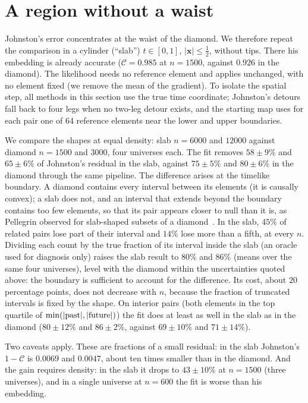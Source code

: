 \documentclass[prd,twocolumn,superscriptaddress,nofootinbib,amsmath,amssymb,floatfix]{revtex4-2}
\begin{document}
\section{A region without a waist}\label{sec:slab}
Johnston's error concentrates at the waist of the diamond. We therefore repeat the comparison in a cylinder (``slab'') $t\in[0,1]$, $|\mathbf x|\le\tfrac12$, without tips. There his embedding is already accurate ($\mathcal C=0.985$ at $n=1500$, against $0.926$ in the diamond). The likelihood needs no reference element and applies unchanged, with no element fixed (we remove the mean of the gradient). To isolate the spatial step, all methods in this section use the true time coordinate; Johnston's detours fall back to four legs when no two-leg detour exists, and the starting map uses for each pair one of 64 reference elements near the lower and upper boundaries.

We compare the shapes at equal density: slab $n=6000$ and $12000$ against diamond $n=1500$ and $3000$, four universes each. The fit removes $58\pm9\%$ and $65\pm6\%$ of Johnston's residual in the slab, against $75\pm5\%$ and $80\pm6\%$ in the diamond through the same pipeline. The difference arises at the timelike boundary. A diamond contains every interval between its elements (it is causally convex); a slab does not, and an interval that extends beyond the boundary contains too few elements, so that its pair appears closer to null than it is, as Pellegrin observed for slab-shaped subsets of a diamond~\cite{Pellegrin26}. In the slab, $45\%$ of related pairs lose part of their interval and $14\%$ lose more than a fifth, at every $n$. Dividing each count by the true fraction of its interval inside the slab (an oracle used for diagnosis only) raises the slab result to $80\%$ and $86\%$ (means over the same four universes), level with the diamond within the uncertainties quoted above: the boundary is sufficient to account for the difference. Its cost, about $20$ percentage points, does not decrease with $n$, because the fraction of truncated intervals is fixed by the shape. On interior pairs (both elements in the top quartile of $\min(|{\rm past}|,|{\rm future}|)$) the fit does at least as well in the slab as in the diamond ($80\pm12\%$ and $86\pm2\%$, against $69\pm10\%$ and $71\pm14\%$).

Two caveats apply. These are fractions of a small residual: in the slab Johnston's $1-\mathcal C$ is $0.0069$ and $0.0047$, about ten times smaller than in the diamond. And the gain requires density: in the slab it drops to $43\pm10\%$ at $n=1500$ (three universes), and in a single universe at $n=600$ the fit is worse than his embedding.
\end{document}
